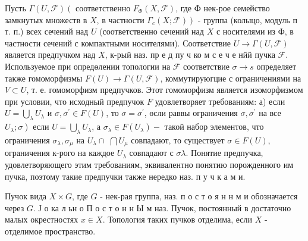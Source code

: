 \documentclass[10pt]{article}
\begin{document}
Пусть $\Gamma(U, \mathscr{F})\left(\right.$ соответственно $F_{\Phi}(X, \mathscr{F})$, где Ф нек-рое семейство замкнутых множеств в $X$, в частности $\left.\Gamma_{c}(X ; \mathscr{F})\right)$ - группа (колыцо, модуль п т. п.) всех сечений над $U$ (соответственно сечений над $X$ с носителями из Ф, в частности сечений с компактными носителями). Соответствие $U \rightarrow \Gamma(U, \mathcal{F})$ является предпучком над $X$, к-рый наз. пр е д пу ч ко м с е ч е нйй пучка $\mathscr{F}$. Используемое при опредөлении топологии на $\mathscr{\mathcal { F }}$ соответствие $\sigma \rightarrow s$ определяет также гомоморфизмы $F(U) \rightarrow \Gamma(U, \mathscr{F})$, коммутируюгцие с ограничениями на $V \subset U$, т. е. гомоморфизм предпучков. Этот гомоморфизм является изоморфизмом при условии, что исходный предпучок $F$ удовлетворяет требованиям: а) если $U=\bigcup_{\lambda} U_{\lambda}$ и $\sigma, \sigma^{\prime} \in F(U)$, то $\sigma=\sigma^{\prime}$, өсли раввы ограничения $\sigma, \sigma^{\prime}$ на все $\left.U_{\lambda} ; \sigma\right)$ если $U=\bigcup_{\lambda} U_{\lambda}$, а $\sigma_{\lambda} \in F\left(U_{\lambda}\right)-$ такой набор элементов, что ограничения $\sigma_{\lambda}, \sigma_{\mu}$ на $U_{\lambda} \cap$ $\bigcap U_{\mu}$ совпадают, то существует $\sigma \in F(U)$, ограничения к-рого на каждое $U_{\lambda}$ совпадают с $\sigma \lambda$. Понятие предпучка, удовлетворяющего этим требованиям, эквивалентно понятию порожденного им пучка, поэтому такие предпучки также нередко наз. п у ч к а м и.



Пучок вида $X \times G$, где $G$ - нек-рая группа, наз. п о с т о я н н м и обозначается через $G$. Ј о ка л ьн о П о с т о н н Ы м наз. Пучок, постоянный в достаточно малых окрестностях $x \in X$. Топология таких пучков отделима, если $X$ - отделимое пространство.
\end{document}
